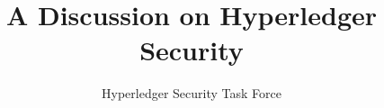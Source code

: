 \documentclass{llncs}
\begin{document}
	
	\title{A Discussion on Hyperledger Security}
	
	\author{%
	Hyperledger Security Task Force
	}
	\institute{}

		
	\maketitle
	\thispagestyle{empty} %

	\begin{abstract}
		
	\end{abstract}


	

	
	
	
\end{document}
